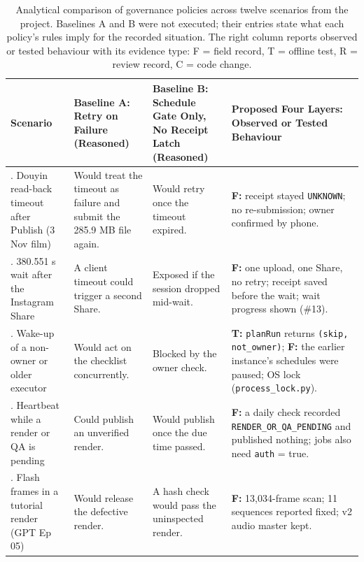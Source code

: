 \documentclass[11pt,a4paper]{article}
\theoremstyle{definition}
\begin{document}
\begin{table}[htbp]
\centering
\caption{Analytical comparison of governance policies across twelve scenarios from the project. Baselines A and B were not executed; their entries state what each policy's rules imply for the recorded situation. The right column reports observed or tested behaviour with its evidence type: F = field record, T = offline test, R = review record, C = code change.}
\label{tab:11}
\scriptsize
\setlength{\tabcolsep}{3pt}
\begin{tabular}{>{\raggedright\hspace{0pt}\arraybackslash}p{}>{\raggedright\hspace{0pt}\arraybackslash}p{}>{\raggedright\hspace{0pt}\arraybackslash}p{}>{\raggedright\hspace{0pt}\arraybackslash}p{}}
\toprule
\textbf{Scenario} & \textbf{Baseline A: Retry on Failure (Reasoned)} & \textbf{Baseline B: Schedule Gate Only, No Receipt Latch (Reasoned)} & \textbf{Proposed Four Layers: Observed or Tested Behaviour} \\
\midrule
1. Douyin read-back timeout after Publish (3 Nov film) & Would treat the timeout as failure and submit the 285.9 MB file again. & Would retry once the timeout expired. & \textbf{F:} receipt stayed \texttt{UNKNOWN}; no re-submission; owner confirmed by phone. \\
2. 380.551 s wait after the Instagram Share & A client timeout could trigger a second Share. & Exposed if the session dropped mid-wait. & \textbf{F:} one upload, one Share, no retry; receipt saved before the wait; wait progress shown (\#13). \\
3. Wake-up of a non-owner or older executor & Would act on the checklist concurrently. & Blocked by the owner check. & \textbf{T:} \texttt{planRun} returns \texttt{(skip, not\_\allowbreak{}owner)}; \textbf{F:} the earlier instance's schedules were paused; OS lock (\texttt{process\_\allowbreak{}lock.\allowbreak{}py}). \\
4. Heartbeat while a render or QA is pending & Could publish an unverified render. & Would publish once the due time passed. & \textbf{F:} a daily check recorded \texttt{RENDER\_\allowbreak{}OR\_\allowbreak{}QA\_\allowbreak{}PENDING} and published nothing; jobs also need \texttt{auth} = true. \\
5. Flash frames in a tutorial render (GPT Ep 05) & Would release the defective render. & A hash check would pass the uninspected render. & \textbf{F:} 13,034-frame scan; 11 sequences reported fixed; v2 audio master kept. \\

\end{tabular}
\end{table}
\end{document}
